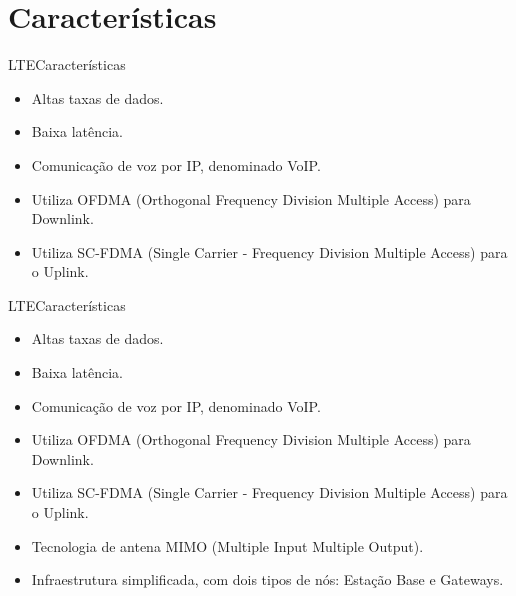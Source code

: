 \documentclass[10pt,aspectratio=169]{beamer} %
\begin{document}
\section{Características}
\begin{frame}{LTE}{Características}
    \begin{itemize}
        \item Altas taxas de dados.
        \item Baixa latência.
        \item Comunicação de voz por IP, denominado VoIP.
        \item Utiliza OFDMA (Orthogonal Frequency Division Multiple Access) para Downlink.
        \item Utiliza SC-FDMA (Single Carrier - Frequency Division Multiple Access) para o Uplink.
    \end{itemize}
\end{frame}
\begin{frame}{LTE}{Características}
    \begin{itemize}
        \item Altas taxas de dados.
        \item Baixa latência.
        \item Comunicação de voz por IP, denominado VoIP.
        \item Utiliza OFDMA (Orthogonal Frequency Division Multiple Access) para Downlink.
        \item Utiliza SC-FDMA (Single Carrier - Frequency Division Multiple Access) para o Uplink.
        \item Tecnologia de antena MIMO (Multiple Input Multiple Output).
        \item Infraestrutura simplificada, com dois tipos de nós: Estação Base e Gateways.
    \end{itemize}
\end{frame}

\end{document}
